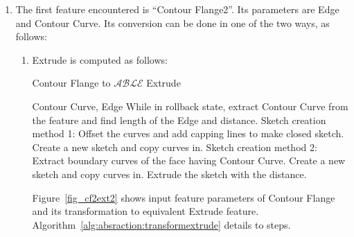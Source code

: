\begin{enumerate}
\begin{minipage}[t]{0.9\linewidth}
\begin{tabular}[h]{@{} p{0.45\linewidth} | p{0.45\linewidth}@{}}
\end{tabular}
\label{tbl:abstraction:input}
\end{minipage}


\item The first feature encountered is ``Contour Flange2''.  Its parameters are Edge and Contour Curve. Its conversion can be done in one of the two ways, as follows:
	\begin{enumerate}
	[noitemsep,topsep=2pt,parsep=2pt,partopsep=2pt]
	\item Extrude  is computed as follows:	
	
	\bigskip
	
			  \begin{minipage}{\linewidth}
		  \begin{algorithm}[H]
			\caption{Contour Flange to $\mathcal{ABLE}$ Extrude}
			\label{alg:absraction:transformextrude}
			\begin{algorithmic}[1]
					\REQUIRE Contour Curve, Edge
					\STATE  While in rollback state, extract Contour Curve from the feature and find length of the Edge and distance.
					\STATE  Sketch creation method 1:  Offset the curves and add capping lines to make closed sketch. Create a new sketch and copy curves in.
					\STATE  Sketch creation method 2:  Extract boundary curves of the face having Contour Curve. Create a new sketch and copy curves in.			
					\STATE Extrude the sketch with the distance.
				\end{algorithmic}
		  \end{algorithm}
		  \end{minipage}	
		  
  \bigskip
  
		Figure~\ref{fig_cf2ext2} shows input feature parameters of Contour Flange and its transformation to equivalent Extrude feature. Algorithm~\ref{alg:absraction:transformextrude} details to steps.
		


\end{enumerate}
\end{enumerate}
